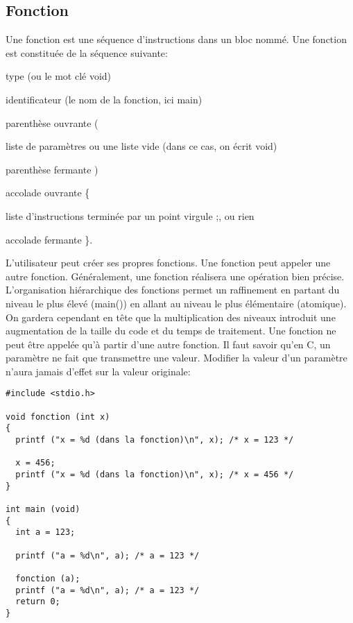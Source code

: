 \documentclass[a4paper]{article}
\begin{document}
\subsection{Fonction}
Une fonction est une séquence d'instructions dans un bloc nommé. Une fonction est constituée de la séquence suivante:
\begin{description}
  \item type (ou le mot clé void)
  \item identificateur (le nom de la fonction, ici main)
  \item parenthèse ouvrante \guillemotleft{} (\guillemotright{}
  \item liste de paramètres ou une liste vide (dans ce cas, on écrit void)
  \item parenthèse fermante \guillemotleft{}) \guillemotright{}
  \item accolade ouvrante \guillemotleft{}\{\guillemotright{}
  \item liste d'instructions terminée par un point virgule \guillemotleft{};\guillemotright{}, ou rien
  \item accolade fermante \guillemotleft{}\}\guillemotright{}.
\end{description}
  L'utilisateur peut créer ses propres fonctions. Une fonction peut appeler une autre fonction. Généralement, une fonction réalisera une opération bien précise. L'organisation hiérarchique des fonctions permet un raffinement en partant du niveau le plus élevé (main()) en allant au niveau le plus élémentaire (atomique).\newline
On gardera cependant en tête que la multiplication des niveaux introduit une augmentation de la taille du code et du temps de traitement.\newline
Une fonction ne peut être appelée qu'à partir d'une autre fonction.\newline
Il faut savoir qu'en C, un paramètre ne fait que transmettre une valeur. Modifier la valeur d'un paramètre n'aura jamais d'effet sur la valeur originale:
\begin{lstlisting}
#include <stdio.h>

void fonction (int x)
{
  printf ("x = %d (dans la fonction)\n", x); /* x = 123 */

  x = 456;
  printf ("x = %d (dans la fonction)\n", x); /* x = 456 */
}

int main (void)
{
  int a = 123;

  printf ("a = %d\n", a); /* a = 123 */

  fonction (a);
  printf ("a = %d\n", a); /* a = 123 */
  return 0;
}
\end{lstlisting}
\end{document}
